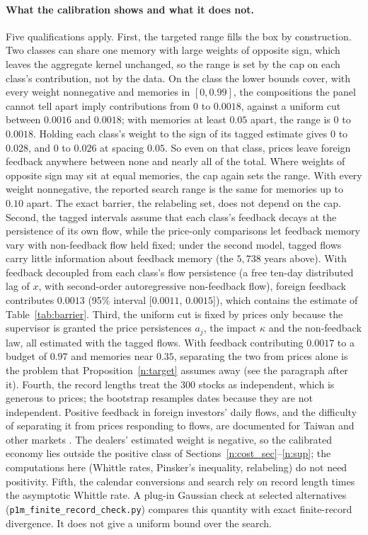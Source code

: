 \documentclass[12pt]{article}
\theoremstyle{definition}
\theoremstyle{remark}
\begin{document}
\paragraph{What the calibration shows and what it does not.} Five qualifications apply. First, the targeted range fills the box by construction. Two classes can share one memory with large weights of opposite sign, which leaves the aggregate kernel unchanged, so the range is set by the cap on each class's contribution, not by the data. On the class the lower bounds cover, with every weight nonnegative and memories in $[0, 0.99]$, the compositions the panel cannot tell apart imply contributions from $0$ to $0.0018$, against a uniform cut between $0.0016$ and $0.0018$; with memories at least $0.05$ apart, the range is $0$ to $0.0018$. Holding each class's weight to the sign of its tagged estimate gives $0$ to $0.028$, and $0$ to $0.026$ at spacing $0.05$. So even on that class, prices leave foreign feedback anywhere between none and nearly all of the total. Where weights of opposite sign may sit at equal memories, the cap again sets the range. With every weight nonnegative, the reported search range is the same for memories up to $0.10$ apart. The exact barrier, the relabeling set, does not depend on the cap. Second, the tagged intervals assume that each class's feedback decays at the persistence of its own flow, while the price-only comparisons let feedback memory vary with non-feedback flow held fixed; under the second model, tagged flows carry little information about feedback memory (the $5{,}738$ years above). With feedback decoupled from each class's flow persistence (a free ten-day distributed lag of $x$, with second-order autoregressive non-feedback flow), foreign feedback contributes $0.0013$ (95\% interval [$0.0011$, $0.0015$]), which contains the estimate of Table~\ref{tab:barrier}. Third, the uniform cut is fixed by prices only because the supervisor is granted the price persistences $a_j$, the impact $\kappa$ and the non-feedback law, all estimated with the tagged flows. With feedback contributing $0.0017$ to a budget of $0.97$ and memories near $0.35$, separating the two from prices alone is the problem that Proposition~\ref{n:target} assumes away (see the paragraph after it). Fourth, the record lengths treat the 300 stocks as independent, which is generous to prices; the bootstrap resamples dates because they are not independent. Positive feedback in foreign investors' daily flows, and the difficulty of separating it from prices responding to flows, are documented for Taiwan and other markets \citep{froot2001,griffin2004,richards2005}. The dealers' estimated weight is negative, so the calibrated economy lies outside the positive class of Sections~\ref{n:cost_sec}--\ref{n:sup}; the computations here (Whittle rates, Pinsker's inequality, relabeling) do not need positivity. Fifth, the calendar conversions and search rely on record length times the asymptotic Whittle rate. A plug-in Gaussian check at selected alternatives (\nolinkurl{p1m_finite_record_check.py}) compares this quantity with exact finite-record divergence. It does not give a uniform bound over the search.
\end{document}
